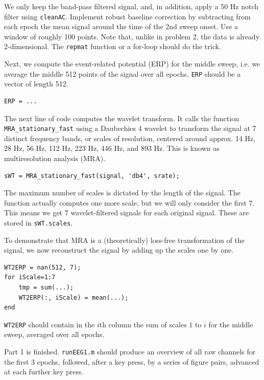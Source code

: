 \documentclass[10pt,a4paper,notitlepage]{report}
\begin{document}
We only keep the band-pass filtered signal, and, in addition, apply a 50 Hz notch filter using \texttt{cleanAC}. Implement robust baseline correction by subtracting from each epoch the mean signal around the time of the 2nd sweep onset. Use a window of roughly 100 points. Note that, unlike in problem 2, the data is already 2-dimensional. The \texttt{repmat} function or a for-loop should do the trick.

Next, we compute the event-related potential (ERP) for the middle sweep, i.e. we average the middle 512 points of the signal over all epochs. \texttt{ERP} should be a vector of length 512.

\begin{verbatim}
ERP = ...
\end{verbatim}

The next line of code computes the wavelet transform. It calls the function \texttt{MRA\_stationary\_fast} using a Daubechies 4 wavelet to transform the signal at 7 distinct frequency bands, or scales of resolution, centered around approx. 14 Hz, 28 Hz, 56 Hz, 112 Hz, 223 Hz, 446 Hz, and 893 Hz. This is known as multiresolution analysis (MRA).

\begin{verbatim}
sWT = MRA_stationary_fast(signal, 'db4', srate);
\end{verbatim}

The maximum number of scales is dictated by the length of the signal. The function actually computes one more scale, but we will only consider the first 7. This means we get 7 wavelet-filtered signals for each original signal. These are stored in \texttt{sWT.scales}.

To demonstrate that MRA is a (theoretically) loss-free transformation of the signal, we now reconstruct the signal by adding up the scales one by one.

\begin{verbatim}
WT2ERP = nan(512, 7);
for iScale=1:7
    tmp = sum(...);
    WT2ERP(:, iScale) = mean(...);
end
\end{verbatim}

\texttt{WT2ERP} should contain in the $i$th column the sum of scales $1$ to $i$ for the middle sweep, averaged over all epochs.

Part 1 is finished. \texttt{runEEG1.m} should produce an overview of all raw channels for the first 3 epochs, followed, after a key press, by a series of figure pairs, advanced at each further key press.
\end{document}
